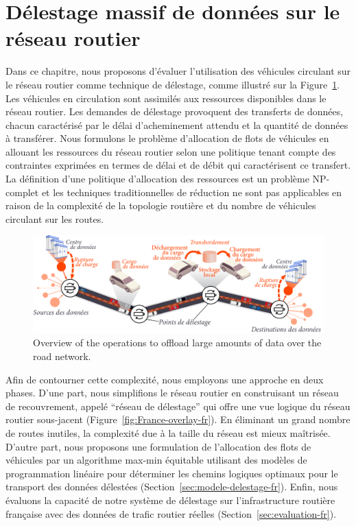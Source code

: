  
\section{Délestage massif de données sur le réseau routier} 
 
 
Dans ce chapitre, nous proposons d’évaluer l’utilisation des véhicules circulant sur le réseau routier comme technique de délestage, comme illustré sur la Figure~\ref{fig:offloading-operations-fr}. Les véhicules en circulation sont assimilés aux ressources disponibles dans le réseau routier. Les demandes de délestage provoquent des transferts de données, chacun caractérisé par le délai d’acheminement attendu et la quantité de données à transférer. Nous formulons le problème d’allocation de flots de véhicules en allouant les ressources du réseau routier selon une politique tenant compte des contraintes exprimées en termes de délai et de débit qui caractérisent ce transfert. La définition d’une politique d’allocation des ressources est un problème NP-complet et les techniques traditionnelles de réduction ne sont pas applicables en raison de la complexité de la topologie routière et du nombre de véhicules circulant sur les routes. 
 
 
\begin{figure}[h!] 
    \centering 
    \includegraphics[width=0.95\columnwidth]{figures-fr/taxonomy-fr.pdf} 
    \caption{Overview of the operations to offload large amounts of data over the road network.} 
    \label{fig:offloading-operations-fr} 
\end{figure} 
 
 
Afin de contourner cette complexité, nous employons une approche en deux phases. D’une part, nous simplifions le réseau routier en construisant un réseau de recouvrement, appelé ``réseau de délestage'' qui offre une vue logique du réseau routier sous-jacent (Figure~\ref{fig:France-overlay-fr}). En éliminant un grand nombre de routes inutiles, la complexité due à la taille du réseau est mieux maîtrisée. D’autre part, nous proposons une formulation de l’allocation des flots de véhicules par un algorithme max-min équitable utilisant des modèles de programmation linéaire pour déterminer les chemins logiques optimaux pour le transport des données délestées (Section~\ref{sec:modele-delestage-fr}). Enfin, nous évaluons la capacité de notre système de délestage sur l’infrastructure routière française avec des données de trafic routier réelles (Section~\ref{sec:evaluation-fr}). 
 
